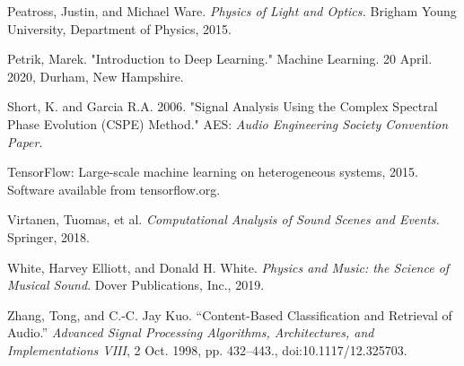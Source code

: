 \documentclass[12pt,letterpaper]{article}
\begin{document}
\begin{thebibliography}{9}
Peatross, Justin, and Michael Ware. \textit{Physics of Light and Optics.} Brigham Young University, Department of Physics, 2015.

Petrik, Marek. "Introduction to Deep Learning." Machine Learning. 20 April. 2020, Durham, New Hampshire.

Short, K. and Garcia R.A. 2006. "Signal Analysis Using the Complex Spectral Phase Evolution (CSPE) Method." AES: \textit{Audio Engineering Society Convention Paper}.

TensorFlow: Large-scale machine learning on heterogeneous systems,
2015. Software available from tensorflow.org.

Virtanen, Tuomas, et al. \textit{Computational Analysis of Sound Scenes and Events.} Springer, 2018.

White, Harvey Elliott, and Donald H. White. \textit{Physics and Music: the Science of Musical Sound}. Dover Publications, Inc., 2019.

Zhang, Tong, and C.-C. Jay Kuo. “Content-Based Classification and Retrieval of Audio.” \textit{Advanced Signal Processing Algorithms, Architectures, and Implementations VIII}, 2 Oct. 1998, pp. 432–443., doi:10.1117/12.325703.

\end{thebibliography}

\end{document}
